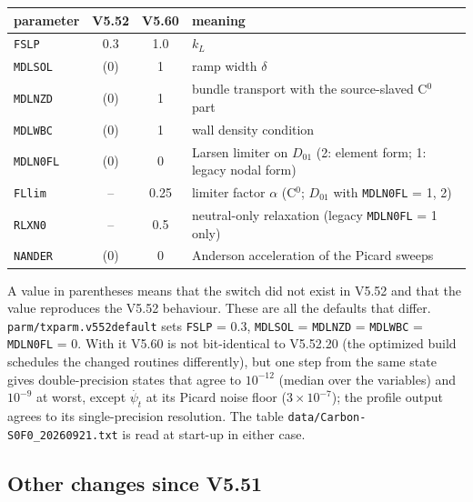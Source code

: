 \documentclass[11pt]{article}
\def\psit{\psi_t}
\def\psitd{\dot{\psit}}
\begin{document}
\begin{center}
\begin{tabular}{|l|c|c|l|}\hline
parameter & V5.52 & V5.60 & meaning \\\hline
\texttt{FSLP}    & 0.3 & 1.0 & $k_L$ \\
\texttt{MDLSOL}  & (0) & 1   & ramp width $\delta$ \\
\texttt{MDLNZD}  & (0) & 1   & bundle transport with the source-slaved C$^0$ part \\
\texttt{MDLWBC}  & (0) & 1   & wall density condition \\
\texttt{MDLN0FL} & (0) & 0   & Larsen limiter on $D_{01}$ (2: element form; 1: legacy nodal form) \\
\texttt{FLlim}   & --  & 0.25 & limiter factor $\alpha$ (C$^0$; $D_{01}$ with \texttt{MDLN0FL} = 1, 2) \\
\texttt{RLXN0}   & --  & 0.5 & neutral-only relaxation (legacy \texttt{MDLN0FL} = 1 only) \\
\texttt{NANDER}  & (0) & 0   & Anderson acceleration of the Picard sweeps \\\hline
\end{tabular}
\end{center}

A value in parentheses means that the switch did not exist in V5.52 and that
the value reproduces the V5.52 behaviour.  These are all the defaults that differ.
\texttt{parm/txparm.v552default} sets
\texttt{FSLP} = 0.3, \texttt{MDLSOL} = \texttt{MDLNZD} = \texttt{MDLWBC} =
\texttt{MDLN0FL} = 0.  With it V5.60 is not bit-identical to V5.52.20 (the
optimized build schedules the changed routines differently), but one step from
the same state gives double-precision states that agree to $10^{-12}$ (median
over the variables) and $10^{-9}$ at worst, except $\psitd$ at its Picard noise
floor ($3\times10^{-7}$); the profile output agrees to its single-precision
resolution.  The table \texttt{data/Carbon-S0F0\_20260921.txt} is read at start-up in
either case.

\subsection{Other changes since V5.51}
\end{document}
